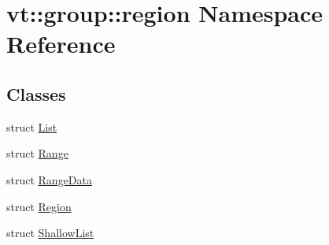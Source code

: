 \hypertarget{namespacevt_1_1group_1_1region}{}\section{vt\+:\+:group\+:\+:region Namespace Reference}
\label{namespacevt_1_1group_1_1region}
\subsection*{Classes}
\begin{DoxyCompactItemize}
\item 
struct \hyperlink{structvt_1_1group_1_1region_1_1_list}{List}
\item 
struct \hyperlink{structvt_1_1group_1_1region_1_1_range}{Range}
\item 
struct \hyperlink{structvt_1_1group_1_1region_1_1_range_data}{Range\+Data}
\item 
struct \hyperlink{structvt_1_1group_1_1region_1_1_region}{Region}
\item 
struct \hyperlink{structvt_1_1group_1_1region_1_1_shallow_list}{Shallow\+List}
\end{DoxyCompactItemize}
